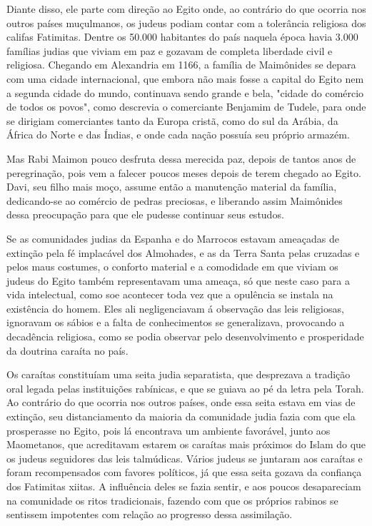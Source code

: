 Diante disso, ele parte com direção ao Egito onde, ao contrário do que
ocorria nos outros países muçulmanos, os judeus podiam contar com a
to­lerância religiosa dos califas Fatimitas. Dentre os 50.000 habitantes
do país na­quela época havia 3.000 famílias judias que viviam em paz e
gozavam de com­pleta liberdade civil e religiosa. Chegando em Alexandria
em 1166, a família de Maimônides se depara com uma cidade internacional,
que embora não mais fosse a capital do Egito nem a segunda cidade do
mundo, continuava sendo grande e bela, "cidade do comércio de todos os
povos", como descrevia o co­merciante Benjamim de Tudele, para onde se
dirigiam comerciantes tanto da Europa cristã, como do sul da Arábia, da
África do Norte e das Índias, e onde cada nação possuía seu próprio
armazém.

Mas Rabi Maimon pouco desfruta dessa merecida paz, depois de tan­tos
anos de peregrinação, pois vem a falecer poucos meses depois de terem
chegado ao Egito. Davi, seu filho mais moço, assume então a manutenção
ma­terial da família, dedicando-se ao comércio de pedras preciosas, e
liberando as­sim Maimônides dessa preocupação para que ele pudesse
continuar seus estudos.

Se as comunidades judias da Espanha e do Marrocos estavam amea­çadas de
extinção pela fé implacável dos Almohades, e as da Terra Santa pelas
cruzadas e pelos maus costumes, o conforto material e a comodidade em
que viviam os judeus do Egito também representavam uma ameaça, só que
neste caso para a vida intelectual, como soe acontecer toda vez que a
opulência se instala na existência do homem. Eles ali negligenciavam á
observação das leis religiosas, ignoravam os sábios e a falta de
conhecimentos se generalizava, pro­vocando a decadência religiosa, como
se podia observar pelo desenvolvimen­to e prosperidade da doutrina
caraíta no país.

Os caraítas constituíam uma seita judia separatista, que desprezava a
tradição oral legada pelas instituições rabínicas, e que se guiava ao pé
da letra pela Torah. Ao contrário do que ocorria nos outros países, onde
essa seita esta­va em vias de extinção, seu distanciamento da maioria da
comunidade judia fazia 
com que ela prosperasse no Egito, pois lá encontrava um ambiente
favo­rável, junto aos Maometanos, que acreditavam estarem os caraítas
mais próxi­mos do Islam do que os judeus seguidores das leis talmúdicas.
Vários judeus se juntaram aos caraítas e foram recompensados com favores
políticos, já que essa seita gozava da confiança dos Fatimitas xiitas. A
influência deles se fazia sentir, e aos poucos desapareciam na
comunidade os ritos tradicionais, fazen­do com que os próprios rabinos
se sentissem impotentes com relação ao pro­gresso dessa assimilação.

